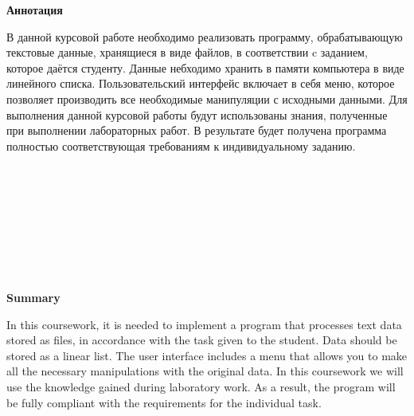 \begin{center}
	\Large{
		\textbf{Аннотация}
	}
\end{center}

В данной курсовой работе необходимо реализовать программу, обрабатывающую текстовые данные, хранящиеся в виде файлов, в соответствии c заданием, которое даётся студенту. Данные небходимо хранить в памяти компьютера в виде линейного списка. Пользовательский интерфейс включает в себя меню, которое позволяет производить все необходимые манипуляции с исходными данными. Для выполнения данной курсовой работы будут использованы знания, полученные при выполнении лабораторных работ. В результате будет получена программа полностью соответствующая требованиям к индивидуальному заданию.
\\
\\
\\
\\
\\
\\
\\
\\
\\
\begin{center}
	\Large{
		\textbf{Summary}
	}
\end{center}

In this coursework, it is needed to implement a program that processes text data stored as files, in accordance with the task given to the student. Data should be stored as a linear list. The user interface includes a menu that allows you to make all the necessary manipulations with the original data. In this coursework we will use the knowledge gained during laboratory work. As a result, the program will be fully compliant with the requirements for the individual task.